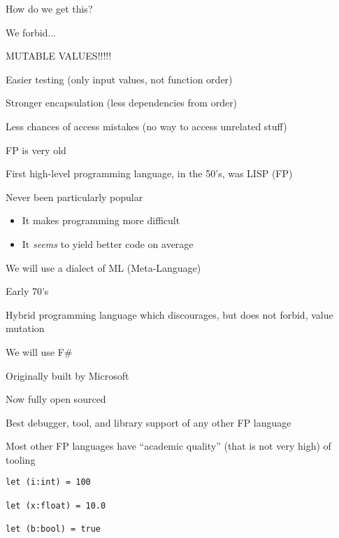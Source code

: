 \documentclass{beamer}
\begin{document}
\begin{slide}{
\item How do we get this?
\item We forbid...
\pause
\item MUTABLE VALUES!!!!!
}\end{slide}

\begin{slide}{
\item Easier testing (only input values, not function order)
\item Stronger encapsulation (less dependencies from order)
\item Less chances of access mistakes (no way to access unrelated stuff)
}\end{slide}

\begin{slide}{
\item FP is very old
\item First high-level programming language, in the 50's, was LISP (FP)
\item Never been particularly popular
\begin{itemize}
\item It makes programming more difficult
\item It \textit{seems} to yield better code on average
\end{itemize}
}\end{slide}

\begin{slide}{
\item We will use a dialect of ML (Meta-Language)
\item Early 70's
\item Hybrid programming language which discourages, but does not forbid, value mutation
}\end{slide}

\begin{slide}{
\item We will use F\#
\item Originally built by Microsoft
\item Now fully open sourced
\item Best debugger, tool, and library support of any other FP language
\item Most other FP languages have ``academic quality'' (that is not very high) of tooling
}\end{slide}

\begin{frame}[fragile]
\begin{lstlisting}
let (i:int) = 100

let (x:float) = 10.0

let (b:bool) = true
\end{lstlisting}
\end{frame}
\end{document}
